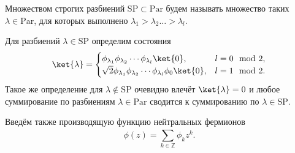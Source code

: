 \documentclass[a4paper,14pt]{extarticle}
\numberwithin{equation}{section}
\begin{document}
Множеством строгих разбиений $\mathrm{SP}\subset \mathrm{Par}$ будем называть множество таких $\lambda \in \mathrm{Par}$, для которых выполнено $\lambda_1>\lambda_2\ldots>\lambda_{l}$.


Для разбиений $\lambda \in \mathrm{SP}$ определим
состояния
\begin{equation}
\ket{\lambda}= \begin{cases}
\phi_{\lambda_1} \phi_{\lambda_2} \cdots \phi_{\lambda_{l}}
\ket{0},& l=0 \mod 2,\\
\sqrt{2} \phi_{\lambda_1}\phi_{\lambda_2}\cdots 
\phi_{\lambda_l} \phi_0 \ket{0},& l=1 \mod 2.
\end{cases}
\end{equation} 
Такое же определение для $\lambda \notin \mathrm{SP}$ очевидно влечёт $\ket{\lambda}=0$ и любое суммирование по разбиениям $\lambda \in \mathrm{Par}$ сводится к суммированию по $\lambda \in \mathrm{SP}$.

Введём также производящую функцию нейтральных фермионов
\begin{equation}
	\phi(z)= \sum_{k \in \mathbb{Z}}^{} \phi_k z^k
.\end{equation} 
\end{document}
